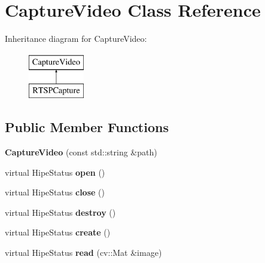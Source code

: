 \hypertarget{class_capture_video}{}\section{Capture\+Video Class Reference}
\label{class_capture_video}
Inheritance diagram for Capture\+Video\+:\begin{figure}[H]
\begin{center}
\leavevmode
\includegraphics[height=2.000000cm]{d4/d6c/class_capture_video}
\end{center}
\end{figure}
\subsection*{Public Member Functions}
\begin{DoxyCompactItemize}
\item 
\mbox{\label{class_capture_video_aaac435b2fdcec0cb8ca674e7f1a6954d}} 
{\bfseries Capture\+Video} (const std\+::string \&path)
\item 
\mbox{\label{class_capture_video_ac8d911e838ab70d49b219ff3490e0deb}} 
virtual Hipe\+Status {\bfseries open} ()
\item 
\mbox{\label{class_capture_video_ac0a442aa7e3b947a1975e9801e4b7ca3}} 
virtual Hipe\+Status {\bfseries close} ()
\item 
\mbox{\label{class_capture_video_a6dfcb36a508c7af1d9fedcc9df5b9c9b}} 
virtual Hipe\+Status {\bfseries destroy} ()
\item 
\mbox{\label{class_capture_video_afc5fbb5d946d34a815dbbf2c1ab71ff6}} 
virtual Hipe\+Status {\bfseries create} ()
\item 
\mbox{\label{class_capture_video_a2c3fca6a34c82b151cc915747399dff9}} 
virtual Hipe\+Status {\bfseries read} (cv\+::\+Mat \&image)
\end{DoxyCompactItemize}
